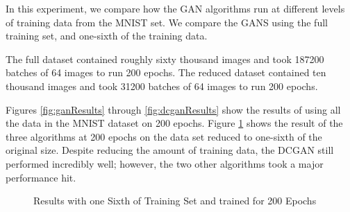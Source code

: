 \documentclass[12pt,
 reprint,
nofootinbib,
 amsmath,amssymb,
 aps,
floatfix,
]{revtex4-2}
\begin{document}
In this experiment, we compare how the GAN algorithms run at different levels of training data from the MNIST set. We compare the GANS using the full training set, and one-sixth of the training data.

The full dataset contained roughly sixty thousand images and took 187200 batches of 64 images to run 200 epochs. The reduced dataset contained ten thousand images and took 31200 batches of 64 images to run 200 epochs.

Figures \ref{fig:ganResults} through \ref{fig:dcganResults} show the results of using all the data in the MNIST dataset on 200 epochs. Figure \ref{fig:reducedData} shows the result of the three algorithms at 200 epochs on the data set reduced to one-sixth of the original size. Despite reducing the amount of training data, the DCGAN still performed incredibly well; however, the two other algorithms took a major performance hit.

\begin{figure}[h!]
    \centering
    \qquad
    \qquad
    \caption{Results with one Sixth of Training Set and trained for 200 Epochs}%
    \label{fig:reducedData}%
\end{figure}
\end{document}

